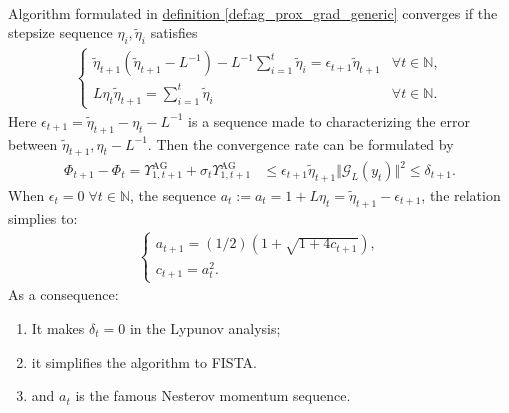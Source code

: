 \documentclass[12pt]{article}
\begin{document}
    \begin{theorem}
        \label{thm:ag_generic_stepsize_constrants}
        \;\\
        Algorithm formulated in 
        \hyperref[def:ag_prox_grad_generic]{definition \ref*{def:ag_prox_grad_generic}}
        converges if the stepsize sequence $\eta_i, \tilde \eta_{i}$ satisfies
        \begin{align*}
            \begin{cases}
                \tilde \eta_{t + 1} (\tilde \eta_{t + 1} - L^{-1})
                - L^{-1} \sum_{i= 1}^{t}\tilde \eta_i 
                = 
                \epsilon_{t + 1} \tilde \eta_{t + 1}
                & \forall t \in \mathbb N, 
                \\
                L \eta_t \tilde \eta_{t + 1} = \sum_{i=1}^{t}\tilde \eta_i 
                & \forall t \in \mathbb N. 
            \end{cases}
        \end{align*}
        Here $\epsilon_{t + 1} = \tilde \eta_{t + 1} - \eta_t - L^{-1}$ is a sequence made to characterizing the error between $\tilde \eta_{t + 1}, \eta_t - L^{-1}$. 
        Then the convergence rate can be formulated by
        \begin{align*}
            \Phi_{t + 1} - \Phi_t =
            \Upsilon_{1, t + 1}^\text{AG} + 
            \sigma_t\Upsilon_{1, t + 1}^{\text{AG}} 
            &\le \epsilon_{t + 1}\tilde\eta_{t + 1} \Vert \mathcal G_L(y_t)\Vert^2 \le \delta_{t + 1}.
        \end{align*}
        When $\epsilon_t = 0 \;\forall t\in \mathbb N$, the sequence $a_t:= a_t = 1 + L \eta_t = \tilde \eta_{t + 1} - \epsilon_{t + 1}$, the relation simplies to: 
        \begin{align*}
            \begin{cases}
                a_{t + 1} = (1/2)\left(
                1 + \sqrt{1 + 4 c_{t + 1}}
                \right), 
                \\
                c_{t + 1} = a_t^2.     
            \end{cases}
        \end{align*}
        As a consequence: 
        \begin{enumerate}
            \item It makes $\delta_{t} = 0$ in the Lypunov analysis; 
            \item it simplifies the algorithm to FISTA. 
            \item and $a_t$ is the famous Nesterov momentum sequence. 
        \end{enumerate}
    \end{theorem}
\end{document}

